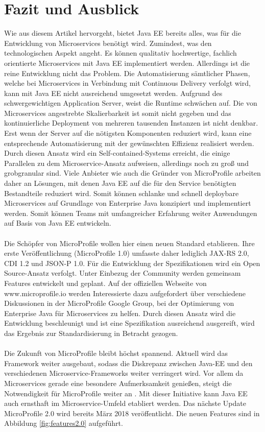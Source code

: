 \section{Fazit und Ausblick}
Wie aus diesem Artikel hervorgeht, bietet Java EE bereits alles, was für die Entwicklung von Microservices benötigt wird. Zumindest, was den technologischen Aspekt angeht. Es können qualitativ hochwertige, fachlich orientierte Microservices mit Java EE implementiert werden. Allerdings ist die reine Entwicklung nicht das Problem. Die Automatisierung sämtlicher Phasen, welche bei Microservices in Verbindung mit Continuous Delivery verfolgt wird, kann mit Java EE nicht ausreichend umgesetzt werden. Aufgrund des schwergewichtigen Application Server, weist die Runtime schwächen auf. Die von Microservices angestrebte Skalierbarkeit ist somit nicht gegeben und das kontinuierliche Deployment von mehreren tausenden Instanzen ist nicht denkbar. Erst wenn der Server auf die nötigsten Komponenten reduziert wird, kann eine entsprechende Automatisierung mit der gewünschten Effizienz realisiert werden. Durch diesen Ansatz wird ein Self-contained-Systems erreicht, die einige Parallelen zu dem Microservice-Ansatz aufweisen, allerdings noch zu groß und grobgranular sind. Viele Anbieter wie auch die Gründer von MicroProfile arbeiten daher an Lösungen, mit denen Java EE auf die für den Service benötigten Bestandteile reduziert wird. Somit können schlanke und schnell deploybare Microservices auf Grundlage von Enterprise Java konzipiert und implementiert werden. Somit können Teams mit umfangreicher Erfahrung weiter Anwendungen auf Basis von Java EE entwickeln. \\ \\
Die Schöpfer von MicroProfile wollen hier einen neuen Standard etablieren. Ihre erste Veröffentlichung (MicroProfile 1.0) umfasste daher lediglich JAX-RS 2.0, CDI 1.2 und JSON-P 1.0. Für die Entwicklung der Spezifikationen wird ein Open Source-Ansatz verfolgt. Unter Einbezug der Community werden gemeinsam Features entwickelt und geplant. Auf der offiziellen Webseite von www.microprofile.io werden Interessierte dazu aufgefordert über verschiedene Diskussionen in der MicroProfile Google Group, bei der Optimierung von Enterprise Java für Microservices zu helfen. Durch diesen Ansatz wird die Entwicklung beschleunigt und ist eine Spezifikation ausreichend ausgereift, wird das Ergebnis zur Standardisierung in Betracht gezogen. \\ \\
Die Zukunft von MicroProfile bleibt höchst spannend. Aktuell wird das Framework weiter ausgebaut, sodass die Diskrepanz zwischen Java-EE und den verschiedenen Microservice-Frameworks weiter verringert wird. Vor allem da Microservices gerade eine besondere Aufmerksamkeit genießen, steigt die Notwendigkeit für MicroProfile weiter an \cite{LarsRowekamp.2018}. Mit dieser Initiative kann Java EE auch ernsthaft im Microservice-Umfeld etabliert werden. Das nächste Update MicroProfile 2.0 wird bereits März 2018 veröffentlicht. Die neuen Features sind in Abbildung \ref{fig:features2.0} aufgeführt. 

